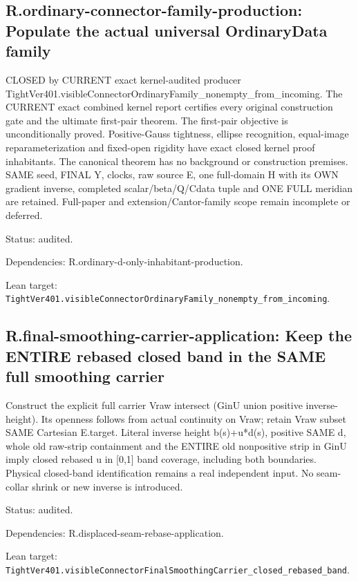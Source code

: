 \documentclass{article}
\begin{document}
\subsection*{R.ordinary-connector-family-production: Populate the actual universal OrdinaryData family}
CLOSED by CURRENT exact kernel-audited producer TightVer401.visibleConnectorOrdinaryFamily\_nonempty\_from\_incoming. The CURRENT exact combined kernel report certifies every original construction gate and the ultimate first-pair theorem. The first-pair objective is unconditionally proved. Positive-Gauss tightness, ellipse recognition, equal-image reparameterization and fixed-open rigidity have exact closed kernel proof inhabitants. The canonical theorem has no background or construction premises. SAME seed, FINAL Y, clocks, raw source E, one full-domain H with its OWN gradient inverse, completed scalar/beta/Q/Cdata tuple and ONE FULL meridian are retained. Full-paper and extension/Cantor-family scope remain incomplete or deferred.
\par Status: audited.
\par Dependencies: R.ordinary-d-only-inhabitant-production.
\par Lean target: \texttt{TightVer401.visibleConnectorOrdinaryFamily\_nonempty\_from\_incoming}.
\subsection*{R.final-smoothing-carrier-application: Keep the ENTIRE rebased closed band in the SAME full smoothing carrier}
Construct the explicit full carrier Vraw intersect (GinU union positive inverse-height). Its openness follows from actual continuity on Vraw; retain Vraw subset SAME Cartesian E.target. Literal inverse height b(s)+u*d(s), positive SAME d, whole old raw-strip containment and the ENTIRE old nonpositive strip in GinU imply closed rebased u in [0,1] band coverage, including both boundaries. Physical closed-band identification remains a real independent input. No seam-collar shrink or new inverse is introduced.
\par Status: audited.
\par Dependencies: R.displaced-seam-rebase-application.
\par Lean target: \texttt{TightVer401.visibleConnectorFinalSmoothingCarrier\_closed\_rebased\_band}.
\end{document}
